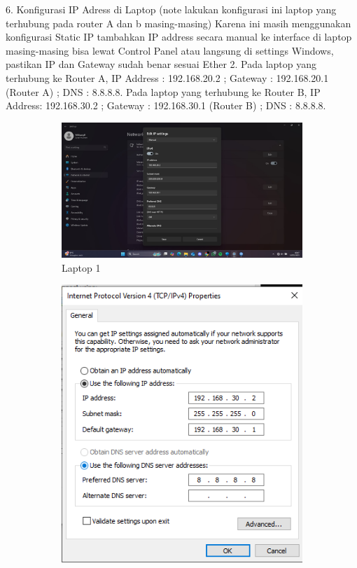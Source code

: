 6. Konfigurasi IP Adress di Laptop (note lakukan konfigurasi ini laptop yang terhubung pada router A dan b masing-masing) Karena ini masih menggunakan konfigurasi Static IP tambahkan IP address secara manual ke interface di laptop masing-masing bisa lewat Control Panel atau langsung di settings Windows, pastikan IP dan Gateway sudah benar sesuai Ether 2. Pada laptop yang terhubung ke Router A, IP Address : 192.168.20.2 ; Gateway : 192.168.20.1 (Router A) ; DNS : 8.8.8.8. Pada laptop yang terhubung ke Router B, IP Address: 192.168.30.2 ; Gateway : 192.168.30.1 (Router B) ; DNS : 8.8.8.8. 
\begin{figure}[H]
    \centering
    \begin{subfigure}[b]{0.3\linewidth}
      \centering
      \includegraphics[width=\linewidth]{image/bridge10.jpg}
      \caption{Laptop 1}
    \end{subfigure}
    \hspace{1cm}
    \begin{subfigure}[b]{0.3\linewidth}
      \centering
      \includegraphics[width=\linewidth]{image/bridge7.png}

\end{subfigure}
\end{figure}
